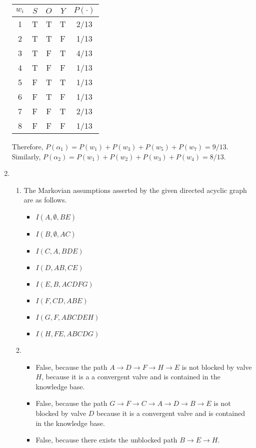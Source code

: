 \documentclass[]{article}
\begin{document}
\begin{enumerate}
\begin{table}[h]
\centering \begin{tabular}{c | c c c | c}
$w_i$ & $S$ & $O$ & $Y$ & $P(\cdot)$\\\hline
1 & T & T & T & 2/13 \\
2 & T & T & F & 1/13 \\
3 & T & F & T & 4/13 \\
4 & T & F & F & 1/13 \\
5 & F & T & T & 1/13 \\
6 & F & T & F & 1/13 \\
7 & F & F & T & 2/13 \\
8 & F & F & F & 1/13 \\
\end{tabular}
\end{table}
Therefore, $P(\alpha_1)=P(w_1)+P(w_3)+P(w_5)+P(w_7)=9/13$. Similarly, $P(\alpha_2)=P(w_1)+P(w_2)+P(w_3)+P(w_4)=8/13$.
\newpage
\item \begin{enumerate}
\item The Markovian assumptions asserted by the given directed acyclic graph are as follows.
\begin{multicols}{2}
\begin{itemize}
\item $I(A,\emptyset,BE)$
\item $I(B,\emptyset,AC)$
\item $I(C,A,BDE)$
\item $I(D,AB,CE)$
\item $I(E,B,ACDFG)$
\item $I(F,CD,ABE)$
\item $I(G,F,ABCDEH)$
\item $I(H,FE,ABCDG)$
\end{itemize}
\end{multicols}
\item \begin{itemize}
\item False, because the path $A\rightarrow D \rightarrow F \rightarrow H \rightarrow E$ is not blocked by valve $H$, because it is a a convergent valve and is contained in the knowledge base.
\item False, because the path $G \rightarrow F \rightarrow C \rightarrow A \rightarrow D \rightarrow B \rightarrow E$ is not blocked by valve $D$ because it is a convergent valve and is contained in the knowledge base.
\item False, because there exists the unblocked path $B \rightarrow E \rightarrow H$.

\end{itemize}
\end{enumerate}
\end{enumerate}
\end{document}

